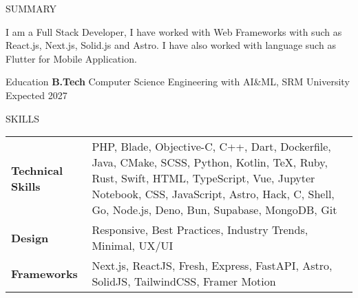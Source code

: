 \documentclass{resume}
\begin{document}

\begin{rSection}{SUMMARY}

I am a Full Stack Developer, I have worked with Web Frameworks with such as React.js, Next.js, Solid.js and Astro. I have also worked with language such as Flutter for Mobile Application.

\end{rSection}


\vspace{1.5em}

\begin{rSection}{Education}
{\bf B.Tech} Computer Science Engineering with AI\&ML, SRM University \hfill {Expected 2027}
\end{rSection}

\vspace{1.5em}


\begin{rSection}{SKILLS}

\begin{tabular}{@{}>{\bfseries}l @{\hspace{4ex}}p{} @{}}
Technical Skills & PHP, Blade, Objective-C, C++, Dart, Dockerfile, Java, CMake, SCSS, Python, Kotlin, TeX, Ruby, Rust, Swift, HTML, TypeScript, Vue, Jupyter Notebook, CSS, JavaScript, Astro, Hack, C, Shell, Go, Node.js, Deno, Bun, Supabase, MongoDB, Git\\
Design & Responsive, Best Practices, Industry Trends, Minimal, UX/UI\\
Frameworks & Next.js, ReactJS, Fresh, Express, FastAPI, Astro, SolidJS, TailwindCSS, Framer Motion\\
\end{tabular}

\end{rSection}

\vspace{1.5em}
\end{document}
